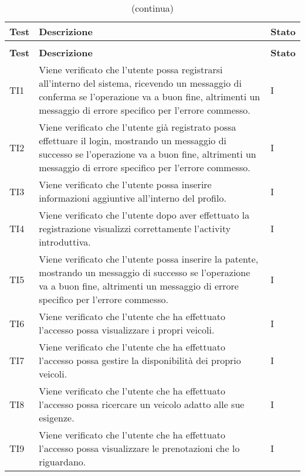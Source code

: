 \begin{longtable}{ >{\centering}p{} >{\centering}p{} >{\centering}p{}
			}%
			
		\caption{Riepilogo test di integrazione}\\	
		\rowcolorhead
		\textbf{\color{white}Test}  
		& \textbf{\color{white}Descrizione} 
		& \textbf{\color{white}Stato}
		\tabularnewline %
		\endfirsthead	
		
		\rowcolor{white}\caption[]{(continua)}\\	
		\rowcolorhead
		\textbf{\color{white}Test} 
		& \textbf{\color{white}Descrizione}
		& \textbf{\color{white}Stato} 
		\tabularnewline %
		\endhead	
TI1&Viene verificato che l'utente possa registrarsi all'interno del sistema, ricevendo un messaggio di conferma se l'operazione va a buon fine, altrimenti un messaggio di errore specifico per l'errore commesso. & I  \tabularnewline

TI2&Viene verificato che l'utente già registrato possa effettuare il login, mostrando un messaggio di successo se l'operazione va a buon fine, altrimenti un messaggio di errore specifico per l'errore commesso. & I  \tabularnewline

TI3&Viene verificato che l'utente possa inserire informazioni aggiuntive all'interno del profilo. & I  \tabularnewline 

TI4&Viene verificato che l'utente dopo aver effettuato la registrazione visualizzi correttamente l'activity introduttiva. & I  \tabularnewline

TI5&Viene verificato che l'utente possa inserire la patente, mostrando un messaggio di successo se l'operazione va a buon fine, altrimenti un messaggio di errore specifico per l'errore commesso. & I  \tabularnewline

TI6&Viene verificato che l'utente che ha effettuato l'accesso possa visualizzare i propri veicoli. & I  \tabularnewline

TI7&Viene verificato che l'utente che ha effettuato l'accesso possa gestire la disponibilità dei proprio veicoli. & I \tabularnewline


TI8&Viene verificato che l'utente che ha effettuato l'accesso possa ricercare un veicolo adatto alle sue esigenze. & I \tabularnewline

TI9&Viene verificato che l'utente che ha effettuato l'accesso possa visualizzare le prenotazioni che lo riguardano. & I  \tabularnewline


\end{longtable}
